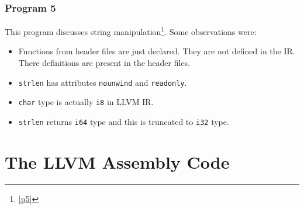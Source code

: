 \documentclass{article}
\begin{document}
\subsubsection{Program 5}
\begin{flushleft}
This program discusses string manipulation\footnote{\ref{p5}}. Some observations were:
\begin{itemize}
\item Functions from header files are just declared. They are not defined in the IR. There definitions are present in the header files.
\item \texttt{strlen} has attributes \texttt{nounwind} and \texttt{readonly}.
\item \texttt{char} type is actually \texttt{i8} in LLVM IR.
\item \texttt{strlen} returns \texttt{i64} type and this is truncated to \texttt{i32} type.
\end{itemize}
\end{flushleft}

\newpage
\section{The LLVM Assembly Code}
\end{document}
